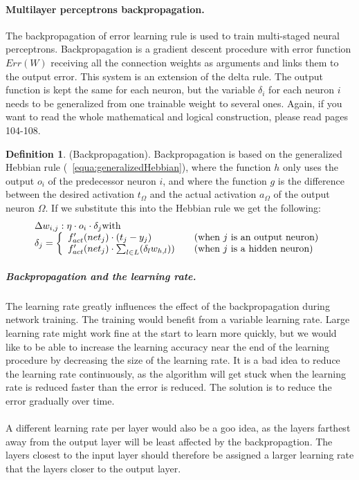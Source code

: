 \documentclass[pdftex,a4paper,12pt,twoside]{report}
\theoremstyle{plain} \newtheorem{theorem}{Theorem} \newtheorem{proposition}{Proposition} \newtheorem{lemma}{Lemma} \newtheorem*{corollary}{Corollary}
\theoremstyle{definition} \newtheorem{definition}{Definition} \newtheorem{conjecture}{Conjecture} \newtheorem*{example}{Example} \newtheorem{algorithm}{Algorithm}
\theoremstyle{remark} \newtheorem*{remark}{Remark} \newtheorem*{note}{Note} \newtheorem{case}{Case}
\begin{document}
\paragraph{Multilayer perceptrons backpropagation.}
The backpropagation of error learning rule is used to train multi-staged neural perceptrons. Backpropagation is a gradient descent procedure with error function $Err(W)$ receiving all the connection weights as arguments and links them to the output error. This system is an extension of the delta rule. The output function is kept the same for each neuron, but the variable $\delta_i$ for each neuron $i$ needs to be generalized from one trainable weight to several ones. Again, if you want to read the whole mathematical and logical construction, please read \citep{Kriesel2013} pages 104-108.
\begin{definition}
(Backpropagation). Backpropagation is based on the generalized Hebbian rule (~\ref{equa:generalizedHebbian}), where the function $h$ only uses the output $o_i$ of the predecessor neuron $i$, and where the function $g$ is the difference between the desired activation $t_\Omega$ and the actual activation $a_\Omega$ of the output neuron $\Omega$. If we substitute this into the Hebbian rule we get the following:
\begin{equation}
\begin{array}{l l}
\Delta w_{i,j} : \eta \cdot o_i \cdot \delta_j \text{with}\\
\delta_j = \left\{
	\begin{array}{l l}
    f'_{act}(net_j) \cdot (t_j - y_j) & \quad \text{(when $j$ is an output neuron)}\\
    f'_{act}(net_j) \cdot \sum_{l \in L}(\delta_lw_{h,l})) & \quad \text{(when $j$ is a hidden neuron)}
  \end{array} \right.
\end{array}
\end{equation}
\end{definition}
\subparagraph{Backpropagation and the learning rate.}
The learning rate greatly influences the effect of the backpropagation during network training. The training would benefit from a variable learning rate. Large learning rate might work fine at the start to learn more quickly, but we would like to be able to increase the learning accuracy near the end of the learning procedure by decreasing the size of the learning rate. It is a bad idea to reduce the learning rate continuously, as the algorithm will get stuck when the learning rate is reduced faster than the error is reduced. The solution is to reduce the error gradually over time.\\\\A different learning rate per layer would also be a goo idea, as the layers farthest away from the output layer will be least affected by the backpropagtion. The layers closest to the input layer should therefore be assigned a larger learning rate that the layers closer to the output layer.
\end{document}
